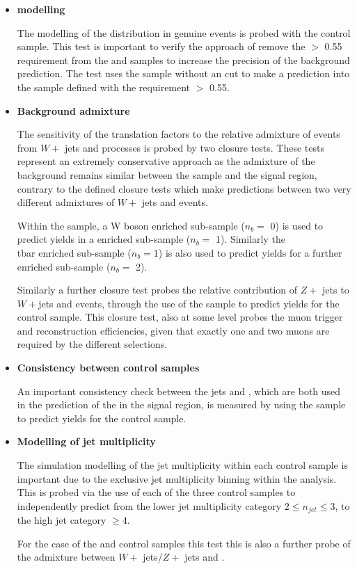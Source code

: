 \begin{itemize}

\item[] \textbf{\alphat modelling}

The modelling of the \alphat distribution in genuine \met events is probed with the \mupjets control sample. This test is important to verify the approach of remove the \alphat $>$ 0.55 requirement from the \mupjets and \dimupjets samples to increase the precision of the background prediction. The test uses the \mupjets sample without an \alphat cut to make a prediction into the \mupjets sample defined with the requirement  \alphat $>$ 0.55.

\item[] \textbf{Background admixture}

The sensitivity of the translation factors to the relative admixture of events from $W +$ jets and \ttbar processes is probed by two closure tests. These tests represent an extremely conservative approach as the admixture of the background remains similar between the \mupjets sample and the signal region, contrary to the defined closure tests which make predictions between two very different admixtures of $W +$ jets and \ttbar events.  

Within the \mupjets sample, a W boson enriched sub-sample ($n_{b} =$ 0) is used to predict yields in a \ttbar enriched sub-sample ($n_{b} =$ 1). Similarly the \\tbar enriched sub-sample ($n_{b} =$1) is also used to predict yields for a further enriched \ttbar sub-sample ($n_{b} =$ 2). 

Similarly a further closure test probes the relative contribution of $Z +$ jets to $W +$jets and \ttbar events, through the use of the \mupjets sample to predict yields for the \dimupjets control sample. This closure test, also at some level probes the muon trigger and reconstruction efficiencies, given that exactly one and two muons are required by the different selections.
 
\item[] \textbf{Consistency between control samples}

An important consistency check between the \dimupjets jets and \gpjets, which are both used in the prediction of the \zinv in the signal region, is measured by using the \gpjets sample to predict yields for the \dimupjets control sample.

\item[]\textbf{Modelling of jet multiplicity}

The simulation modelling of the jet multiplicity within each control sample is important due to the exclusive jet multiplicity binning within the analysis. This is probed via the use of each of the three control samples to independently predict from the lower jet multiplicity category $2 \leq n_{jet} \leq 3$, to the high jet category $\geq 4$. 

For the case of the \mupjets and \dimupjets control samples this test this is also a further probe of the admixture between $W +$ jets/$Z +$ jets and \ttbar. 
\end{itemize}

